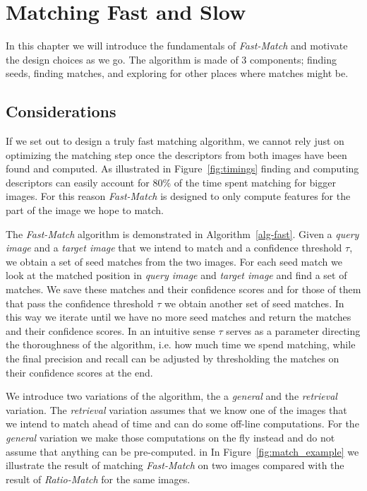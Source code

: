 \documentclass[runningheads]{llncs}
\begin{document}
\section{Matching Fast and Slow}
\label{algorithm}

In this chapter we will introduce the fundamentals of \emph{Fast-Match} and motivate the design choices as we go. The algorithm is made of 3 components; finding seeds, finding matches, and exploring for other places where matches might be.

\subsection{Considerations}
\label{considerations}

If we set out to design a truly fast matching algorithm, we cannot rely just on optimizing the matching step once the descriptors from both images have been found and computed. As illustrated in Figure~\ref{fig:timings} finding and computing descriptors can easily account for 80\% of the time spent matching for bigger images. For this reason \emph{Fast-Match} is designed to only compute features for the part of the image we hope to match. 

The \emph{Fast-Match} algorithm is demonstrated in Algorithm~\ref{alg-fast}. Given a \emph{query image} and a \emph{target image} that we intend to match and a confidence threshold $\tau$, we obtain a set of seed matches from the two images. For each seed match we look at the matched position in \emph{query image} and \emph{target image} and find a set of matches. We save these matches and their confidence scores and for those of them that pass the confidence threshold $\tau$ we obtain another set of seed matches. In this way we iterate until we have no more seed matches and return the matches and their confidence scores. In an intuitive sense $\tau$ serves as a parameter directing the thoroughness of the algorithm, i.e. how much time we spend matching, while the final precision and recall can be adjusted by thresholding the matches on their confidence scores at the end.

We introduce two variations of the algorithm, the a \emph{general} and the \emph{retrieval} variation. The \emph{retrieval} variation assumes that we know one of the images that we intend to match ahead of time and can do some off-line computations. For the \emph{general} variation we make those computations on the fly instead and do not assume that anything can be pre-computed. in In Figure~\ref{fig:match_example} we illustrate the result of matching \emph{Fast-Match} on two images compared with the result of \emph{Ratio-Match} for the same images.
\end{document}
